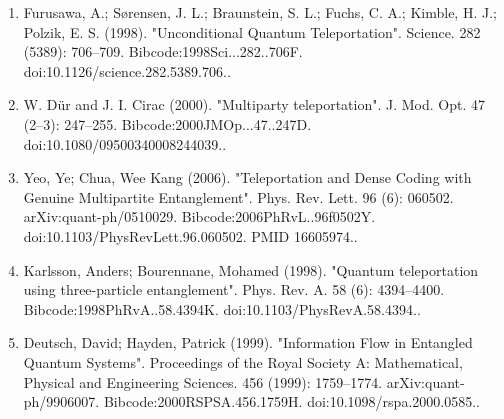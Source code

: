 \begin{enumerate}
\item Furusawa, A.; Sørensen, J. L.; Braunstein, S. L.; Fuchs, C. A.; Kimble, H. J.; Polzik, E. S. (1998). "Unconditional Quantum Teleportation". Science. 282 (5389): 706–709. Bibcode:1998Sci...282..706F. doi:10.1126/science.282.5389.706..
\item W. Dür and J. I. Cirac (2000). "Multiparty teleportation". J. Mod. Opt. 47 (2–3): 247–255. Bibcode:2000JMOp...47..247D. doi:10.1080/09500340008244039..
\item Yeo, Ye; Chua, Wee Kang (2006). "Teleportation and Dense Coding with Genuine Multipartite Entanglement". Phys. Rev. Lett. 96 (6): 060502. arXiv:quant-ph/0510029. Bibcode:2006PhRvL..96f0502Y. doi:10.1103/PhysRevLett.96.060502. PMID 16605974..
\item Karlsson, Anders; Bourennane, Mohamed (1998). "Quantum teleportation using three-particle entanglement". Phys. Rev. A. 58 (6): 4394–4400. Bibcode:1998PhRvA..58.4394K. doi:10.1103/PhysRevA.58.4394..
\item Deutsch, David; Hayden, Patrick (1999). "Information Flow in Entangled Quantum Systems". Proceedings of the Royal Society A: Mathematical, Physical and Engineering Sciences. 456 (1999): 1759–1774. arXiv:quant-ph/9906007. Bibcode:2000RSPSA.456.1759H. doi:10.1098/rspa.2000.0585..
\end{enumerate}
